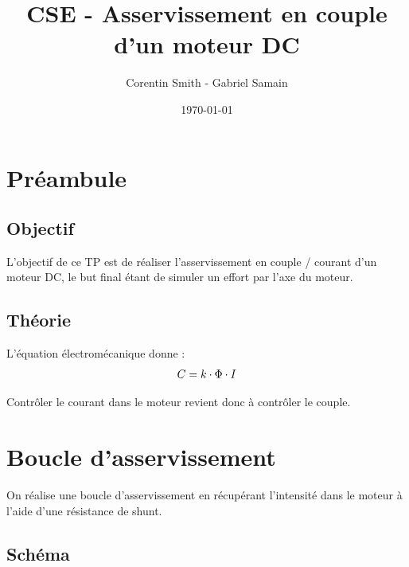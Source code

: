 \documentclass[a4paper]{article}
\title{CSE - Asservissement en couple d'un moteur DC}
\author{Corentin Smith - Gabriel Samain}
\date{\today}
\begin{document}
\maketitle


\section{Préambule}

\subsection{Objectif}

L'objectif de ce TP est de réaliser l'asservissement en couple / courant d'un moteur DC, le but final étant de simuler un effort par l'axe du moteur.

\subsection{Théorie}

L'équation électromécanique donne :
$$
C = k \cdot \Phi \cdot I \\
$$

Contrôler le courant dans le moteur revient donc à contrôler le couple.

\section{Boucle d'asservissement}

On réalise une boucle d’asservissement en récupérant l’intensité dans le moteur à l’aide d’une résistance de shunt.

\subsection{Schéma}

\begin{center}
\end{center}
\end{document}
